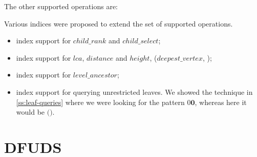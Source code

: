 \begin{algorithmic}
		\State {}
	\Else
		\State {}
	\EndIf
\EndFunction
\end{algorithmic}

\begin{algorithmic}
		\State {}
	\Else
		\State {}
	\EndIf
\EndFunction
\end{algorithmic}

\begin{algorithmic}
		\State {}
	\Else
		\State {}
	\EndIf
\EndFunction
\end{algorithmic}

The other supported operations are:
\begin{algorithmic}
	\State {}
\EndFunction
\end{algorithmic}

\begin{algorithmic}
	\State {}
\EndFunction
\end{algorithmic}

\begin{algorithmic}
	\State {}
\EndFunction
\end{algorithmic}

\bigskip

Various indices were proposed to extend the set of supported operations.
\begin{itemize}
	\item index support for $child\_rank$ and $child\_select$;
	\item index support for $lca$, $distance$ and $height$, ($deepest\_vertex$, );
	\item index support for $level\_ancestor$;
	\item index support for querying unrestricted leaves.
	We showed the technique in \ref{ss:leaf-queries} where we were looking for the pattern $0\mathbf{0}$, whereas here it would be $\textbf{(})$.
\end{itemize}

\section{DFUDS}

